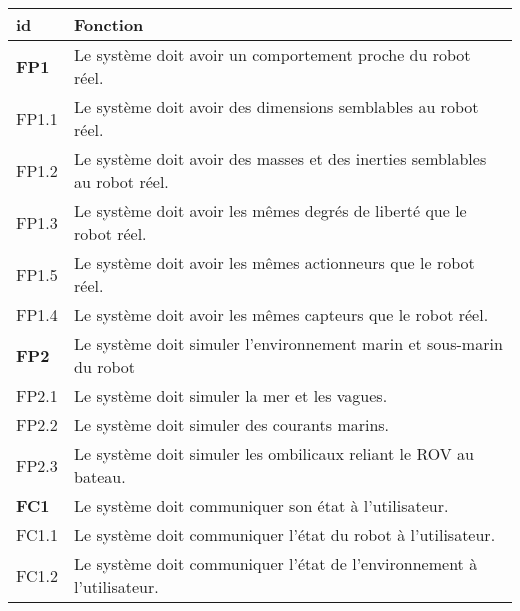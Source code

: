         \begin{table}[!htb]
            \centering
            \begin{adjustbox}{max width=\textwidth}
                \begin{tabularx}{\textwidth}{|lX|}
                    \hline
                    \cellcolor{gray!25}\textbf{id} & \cellcolor{gray!25} \textbf{Fonction} \\
                    \hline \hline
                    \cellcolor{blue!30}\textbf{FP1}&\cellcolor{blue!25} Le système doit avoir un comportement proche du robot réel. \\
                    \hline
                    \cellcolor{gray!10}FP1.1& Le système doit avoir des dimensions semblables au robot réel. \\
                    \hline
                    \cellcolor{gray!10}FP1.2& Le système doit avoir des masses et des inerties semblables au robot réel. \\
                    \hline
                    \cellcolor{gray!10}FP1.3& Le système doit avoir les mêmes degrés de liberté que le robot réel. \\
                    \hline
                    \cellcolor{gray!10}FP1.5& Le système doit avoir les mêmes actionneurs que le robot réel. \\
                    \hline
                    \cellcolor{gray!10}FP1.4& Le système doit avoir les mêmes capteurs que le robot réel. \\
            
                    \hline \hline
            
                    \cellcolor{blue!30}\textbf{FP2}&\cellcolor{blue!25} Le système doit simuler l'environnement marin et sous-marin du robot \\
                    \hline
                    \cellcolor{gray!10}FP2.1& Le système doit simuler la mer et les vagues. \\
                    \hline
                    \cellcolor{gray!10}FP2.2& Le système doit simuler des courants marins. \\
                    \hline
                    \cellcolor{gray!10}FP2.3& Le système doit simuler les ombilicaux reliant le \gls{ROV} au bateau. \\
            
                    \hline \hline
            
                    \cellcolor{orange!40}\textbf{FC1} &\cellcolor{orange!30} Le système doit communiquer son état à l'utilisateur. \\
                    \hline
                    \cellcolor{gray!10}FC1.1& Le système doit communiquer l'état du robot à l'utilisateur. \\
                    \hline
                    \cellcolor{gray!10}FC1.2& Le système doit communiquer l'état de l'environnement à l'utilisateur.\\
            

\end{tabularx}
\end{adjustbox}
\end{table}
